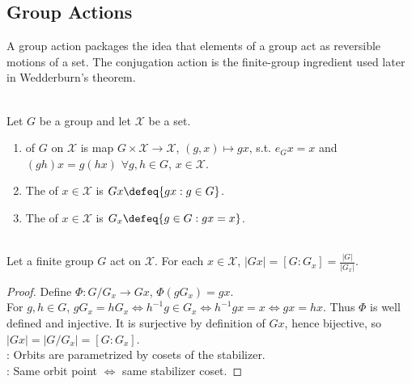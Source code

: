 \subsection{Group Actions}


A group action packages the idea that elements of a group act as reversible
motions of a set. The conjugation action is the finite-group ingredient used
later in Wedderburn's theorem.

\begin{definition} \label{def:group-action-orbit-stabilizer} \\
Let $G$ be a group and let $\mathcal{X}$ be a set.
\begin{enumerate}[label=(\roman*)]
\setlength{\itemsep}{0pt}
\item {} of $G$ on $\mathcal{X}$ is map $G\times\mathcal{X}\to\mathcal{X}$, $(g,x)\mapsto gx$, s.t. $e_Gx=x$ and $(gh)x=g(hx)$ $\forall g,h\in G$, $x\in\mathcal{X}$.
\item The  of $x\in\mathcal{X}$ is $Gx\defeq\{gx:g\in G\}$.
\item The  of $x\in\mathcal{X}$ is $G_x\defeq\{g\in G:gx=x\}$.
\end{enumerate}
\end{definition}

\begin{theorem} \label{thm:orbit-stabilizer-finite-group-actions} \\
Let a finite group $G$ act on $\mathcal{X}$. For each $x\in\mathcal{X}$, $|Gx|=[G:G_x]=\frac{|G|}{|G_x|}$.
\begin{proof}
Define $\Phi:G/G_x\to Gx$, $\Phi(gG_x)=gx$.\\
For $g,h\in G$, $gG_x=hG_x \iff h^{-1}g\in G_x \iff h^{-1}gx=x \iff gx=hx$. Thus $\Phi$ is well defined and injective. It is surjective by definition of $Gx$, hence bijective, so $|Gx|=|G/G_x|=[G:G_x]$.\\
: Orbits are parametrized by cosets of the stabilizer.\\
: Same orbit point $\iff$ same stabilizer coset.
\end{proof}
\end{theorem}

